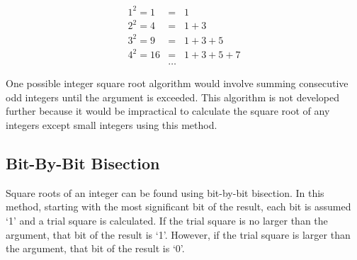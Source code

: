 \begin{eqnarray}
\nonumber 1^2 =   1   & = & 1 \\
          2^2 =   4   & = & 1 + 3 \\
\nonumber 3^2 =   9   & = & 1 + 3 + 5 \\
\nonumber 4^2 =  16   & = & 1 + 3 + 5 + 7 \\
\nonumber             & \ldots{} &
\end{eqnarray}

One possible integer square root algorithm would involve summing consecutive
odd integers until the argument is exceeded.
This algorithm is not developed further because it would be impractical to
calculate the square root of any integers except small integers using this
method.


\subsection{Bit-By-Bit Bisection}
\label{ctbg0:ssre0:sbis0}

Square roots of an integer can be found using bit-by-bit bisection.
In this method, starting with the most significant bit of the result, each bit
is assumed `1' and a trial square is calculated.  If the trial square is no
larger than the argument, that bit of the result is `1'.  However, if the trial
square is larger than the argument, that bit of the result is `0'.

